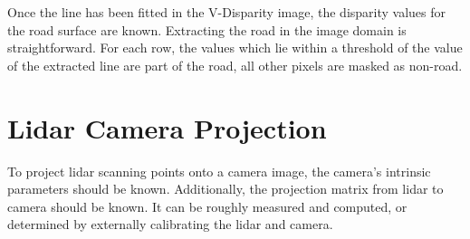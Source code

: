 Once the line has been fitted in the V-Disparity image, the disparity values for the road surface are known. Extracting the road in the image domain is straightforward. For each row, the values which lie within a threshold of the value of the extracted line are part of the road, all other pixels are masked as non-road.


\section{Lidar Camera Projection}

To project lidar scanning points onto a camera image, the camera's intrinsic parameters should be known. Additionally, the projection matrix from lidar to camera should be known. It can be roughly measured and computed, or determined by externally calibrating the lidar and camera.